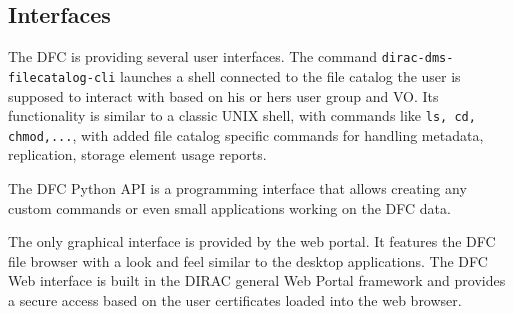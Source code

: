 \subsection{Interfaces}

The DFC is providing several user interfaces. The command \texttt{dirac-dms-filecatalog-cli} launches a shell
connected to the file catalog the user is supposed to interact with based on his or hers user group and VO. Its 
functionality is similar to a classic UNIX shell, with commands like \texttt{ls, cd, chmod,...}, with added 
file catalog specific commands for handling metadata, replication, storage element usage reports.

The DFC Python API is a programming interface that allows creating any custom commands or even
small applications working on the DFC data.

The only graphical interface is provided by the web portal. It features the DFC file browser
with a look and feel similar to the desktop applications. The DFC Web interface is built in the DIRAC 
general Web Portal framework and provides a secure access based on the user certificates loaded into 
the web browser.